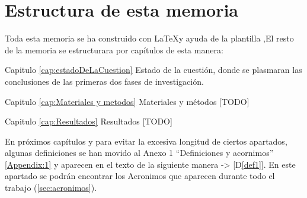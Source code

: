 \section{Estructura de esta memoria}

Toda esta memoria se ha construido con \LaTeX\space [\ref{latexDef}] y ayuda de la plantilla \texis,\space El resto de la memoria se estructurara por capítulos de esta manera:

Capitulo \ref{cap:estadoDeLaCuestion} Estado de la cuestión, donde se plasmaran las conclusiones de las primeras dos fases de investigación.

Capitulo \ref{cap:Materiales y metodos} Materiales y métodos [TODO]

Capitulo \ref{cap:Resultados} Resultados [TODO]

En próximos capítulos y para evitar la excesiva longitud de ciertos apartados, algunas definiciones se han movido al Anexo 1 ``Definiciones y acornimos'' \ref{Appendix:1} y aparecen en el texto de la siguiente manera -> [D\ref{def1}]. En este apartado se podrán encontrar los Acronimos que aparecen durante todo el trabajo (\ref{sec:acronimos}).

